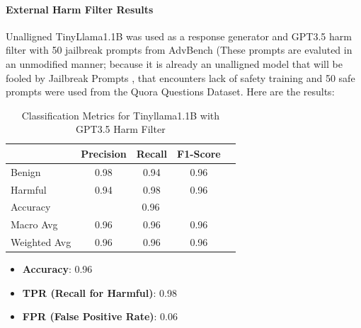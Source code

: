 \documentclass[../main.tex]{subfiles}
\begin{document}
\paragraph*{ External Harm Filter Results}  
Unalligned TinyLlama1.1B was used as a response generator and GPT3.5 harm filter with 50 jailbreak prompts from AdvBench (These prompts are evaluted in an unmodified manner; because it is already an unalligned model that will be fooled by Jailbreak Prompts , that encounters lack of safety training  and 50 safe prompts  were used from the Quora Questions Dataset. Here are the results:

\begin{table}[h]
\centering
\caption{Classification Metrics for Tinyllama1.1B with GPT3.5 Harm Filter}
\begin{tabular}{lcccc}
\toprule
 & Precision & Recall & F1-Score  \\
\midrule
Benign & 0.98 & 0.94 & 0.96\\
Harmful & 0.94 & 0.98 & 0.96 \\
\midrule
Accuracy & \multicolumn{3}{c}{0.96}\\
Macro Avg & 0.96 & 0.96 & 0.96 \\
Weighted Avg & 0.96 & 0.96 & 0.96\\
\bottomrule
\end{tabular}
\end{table}

\begin{itemize}
    \item \textbf{Accuracy}: 0.96
    \item \textbf{TPR (Recall for Harmful)}: 0.98
    \item \textbf{FPR (False Positive Rate)}: 0.06
\end{itemize}
\end{document}
